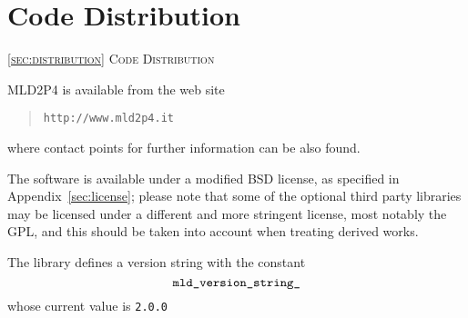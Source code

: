 \section{Code Distribution\label{sec:distribution}}
         {\textsc{\ref{sec:distribution} Code Distribution}}

\noindent
MLD2P4 is available from the web site 
\begin{quotation}
\texttt{http://www.mld2p4.it}
\end{quotation}
where contact points for further information can be also found.

The software is available under a modified BSD license, as specified
in Appendix~\ref{sec:license}; please note that some of the optional
third party libraries may be licensed under a different and more
stringent license, most notably the GPL, and this should be taken into
account when treating derived works. 

The library defines a version string with the
constant 
\[ \verb|mld_version_string_|\]
whose current value is \verb|2.0.0|

